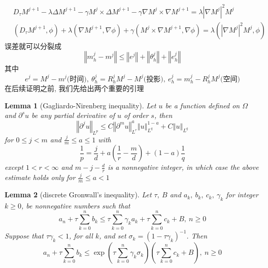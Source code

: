\documentclass[UTF8,a4paper]{article}
\newtheorem{Lemma}{Lemma}[section]
\begin{document}
\begin{equation*}
\begin{aligned}
&D_{\tau}M^{j+1}-\lambda\Delta M^{j+1}-\gamma M^j\times\Delta M^{j+1}-\gamma \nabla M^j\times\nabla M^{j+1}=\lambda \left| \nabla M^j \right| ^2M^j& &&\\ 
&(D_{\tau}M^{j+1},\phi)+\lambda(\nabla M^{j+1},\nabla\phi)+\gamma(M^j\times\nabla M^{j+1},\nabla\phi)=\lambda(\left| \nabla M^j \right|^2M^j,\phi)& &&
\end{aligned}
\end{equation*}
误差就可以分裂成 
\begin{equation*}
\left\Vert m_h^j-m^j\right\Vert\leq \left\Vert e^j\right\Vert+\left\Vert \theta_h^j\right\Vert+\left\Vert e_h^j\right\Vert
\end{equation*}
其中
\begin{equation*}
e^j=M^j-m^j\text{(时间)},\ \theta_h^j=R_h^jM^j-M^j\text{(投影)},\ e_h^j=m_h^j-R_h^jM^j\text{(空间)}
\end{equation*}
在后续证明之前, 我们先给出两个重要的引理
\begin{Lemma}[Gagliardo-Nirenberg inequality]
  Let $u$ be a function defined on $\Omega$ and $\partial^su$ be any partial derivative of $u$ of order $s$, then
\begin{equation*}
\left\Vert \partial^ju\right\Vert_{L^p}\leq C \left\Vert \partial^mu\right\Vert_{L^r}^a \left\Vert u\right\Vert_{L^q}^{1-a}+C \left\Vert u\right\Vert_{L^q}
\end{equation*}
for $0\leq j<m$ and $\frac{j}{m}\leq a\leq1$ with 
\begin{equation*}
\frac{1}{p}=\frac{j}{d}+a \left( \frac{1}{r}-\frac{m}{d}\right)+(1-a)\frac{1}{q}
\end{equation*}
except $1<r<\infty$ and $m-j-\frac{d}{r}$ is a nonnegative integer, in which case the above estimate holds only for $\frac{j}{m}\leq a<1$
\end{Lemma}
\begin{Lemma}[discrete Gronwall's inequality]
  Let $\tau,\ B$ and $a_k,\ b_k,\ c_k,\ \gamma_k$ for integer $k\geq0$, be nonnegative numbers such that 
\begin{equation*}
a_n+\tau\sum_{k=0}^nb_k\leq\tau\sum_{k=0}^n\gamma_ka_k+\tau\sum_{k=0}^nc_k+B,\ n\geq0
\end{equation*}
Suppose that $\tau\gamma_k<1$, for all $k$, and set $\sigma_k=(1-\tau\gamma_k)^{-1}$. Then 
\begin{equation*}
a_n+\tau\sum_{k=0}^nb_k\leq\exp \left( \tau\sum_{k=0}^n\gamma_k\sigma_k\right)\left( \tau\sum_{k=0}^nc_k+B\right),\ n\geq0
\end{equation*}
\end{Lemma}
\end{document}
